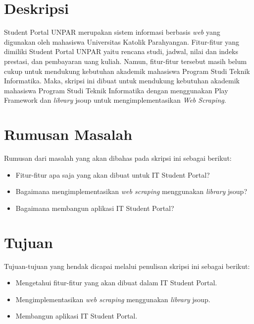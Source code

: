 \documentclass[a4paper,twoside]{article}
\begin{document}
\title{\@judultopik}
\author{\nama \textendash \@npm} 

\newcommand{\nama}{Herfan Heryandi}
\newcommand{\@npm}{2012730012}
\newcommand{\@judultopik}{IT Student Portal: Pemanfaatan \textit{Web Scraping} untuk Kustomisasi Student Portal UNPAR} %
\newcommand{\jumpemb}{1} %
\newcommand{\tanggal}{10/09/2015}
\maketitle


\section{Deskripsi}
Student Portal UNPAR merupakan sistem informasi berbasis \textit{web} yang digunakan oleh mahasiswa Universitas Katolik Parahyangan. Fitur-fitur yang dimiliki Student Portal UNPAR yaitu rencana studi, jadwal, nilai dan indeks prestasi, dan pembayaran uang kuliah. Namun, fitur-fitur tersebut masih belum cukup untuk mendukung kebutuhan akademik mahasiswa Program Studi Teknik Informatika. Maka, skripsi ini dibuat untuk mendukung kebutuhan akademik mahasiswa Program Studi Teknik Informatika dengan menggunakan Play Framework dan \textit{library} jsoup untuk mengimplementasikan \textit{Web Scraping}.

\section{Rumusan Masalah}
Rumusan dari masalah yang akan dibahas pada skripsi ini sebagai
berikut:
\begin{itemize}
	\item Fitur-fitur apa saja yang akan dibuat untuk IT Student Portal?
	\item Bagaimana mengimplementasikan \textit{web scraping} menggunakan \textit{library} jsoup?
	\item Bagaimana membangun aplikasi IT Student Portal?
\end{itemize}

\section{Tujuan}
Tujuan-tujuan yang hendak dicapai melalui penulisan skripsi ini sebagai berikut:
\begin{itemize}
	\item	Mengetahui fitur-fitur yang akan dibuat dalam IT Student Portal.
	\item	Mengimplementasikan \textit{web scraping} menggunakan \textit{library} jsoup.
	\item Membangun aplikasi IT Student Portal.
\end{itemize}
\end{document}
